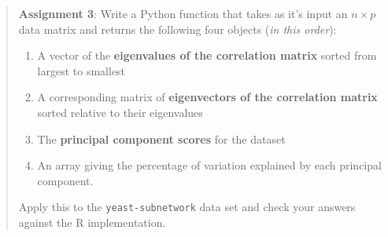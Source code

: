 \begin{quote}
\textbf{Assignment 3}: Write a Python function that takes as it's input
an $n \times p$ data matrix and returns the following four objects
(\emph{in this order}):

\begin{enumerate}[1.]
\item
  A vector of the \textbf{eigenvalues of the correlation matrix} sorted
  from largest to smallest
\item
  A corresponding matrix of \textbf{eigenvectors of the correlation
  matrix} sorted relative to their eigenvalues
\item
  The \textbf{principal component scores} for the dataset
\item
  An array giving the percentage of variation explained by each
  principal component.
\end{enumerate}
Apply this to the \lstinline!yeast-subnetwork! data set and check your
answers against the R implementation.

\end{quote}
